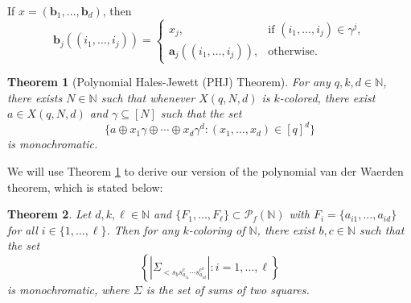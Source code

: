 \documentclass[12pt]{amsart}
\theoremstyle{plain}
\newtheorem{theorem}{Theorem}[section]
\theoremstyle{definition}
\theoremstyle{remark}
\numberwithin{equation}{section}
\begin{document}
If \( x = (\mathbf{b}_1, \dots, \mathbf{b}_d) \), then
\[
\mathbf{b}_j((i_1, \dots, i_j)) = 
\begin{cases} 
x_j, & \text{if } (i_1, \dots, i_j) \in \gamma^j, \\
\mathbf{a}_j((i_1, \dots, i_j)), & \text{otherwise.}
\end{cases}
\]

\begin{theorem}[Polynomial Hales-Jewett (PHJ) Theorem] \label{phj}
For any \( q, k, d \in \mathbb{N} \), there exists \( N \in \mathbb{N} \) such that whenever \( X(q, N, d) \) is \( k \)-colored, there exist \( a \in X(q, N, d) \) and \( \gamma \subseteq [N] \) such that the set
\[
\{ a \oplus x_1 \gamma \oplus \cdots \oplus x_d \gamma^d : (x_1, \dots, x_d) \in [q]^d \}
\]
is monochromatic.
\end{theorem}

We will use Theorem \ref{phj} to derive our version of the polynomial van der Waerden theorem, which is stated below:

\begin{theorem}
Let \( d, k, \ell \in \mathbb{N} \) and \( \{F_1, \dots, F_\ell\} \subset \mathcal{P}_f(\mathbb{N}) \) with \( F_i = \{a_{i1}, \dots, a_{id}\} \) for all \( i \in \{1, \dots, \ell\} \). Then for any \( k \)-coloring of \( \mathbb{N} \), there exist \( b, c \in \mathbb{N} \) such that the set 
\[
\left\{\left|\Sigma_{<s_b s_{a_{i1}}^{c} \cdots s_{a_{id}}^{c^d}}\right| : i = 1, \dots, \ell \right\}
\]
is monochromatic, where \( \Sigma \) is the set of sums of two squares.
\end{theorem}
\end{document}
